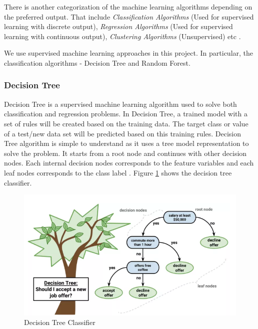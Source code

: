 \documentclass[sigconf]{acmart}
\begin{document}
There is another categorization of the machine learning algorithms depending on the preferred output. That include \emph{Classification Algorithms} (Used for supervised learning with discrete output), \emph{Regression Algorithms} (Used for supervised learning with continuous output), \emph{Clustering Algorithms} (Unsupervised) etc \cite{wiki-machine-learning}.

We use supervised machine learning approaches in this project. In particular, the classification algorithms - Decision Tree and Random Forest.

\subsubsection{Decision Tree}\label{Decision Tree}

Decision Tree is a supervised machine learning algorithm used to solve both classification and regression problems. In Decision Tree, a trained model with a set of rules will be created based on the training data. The target class or value of a test/new data set will be predicted based on this training rules. Decision Tree algorithm is simple to understand as it uses a tree model representation to solve the problem. It starts from a root node and continues with other decision nodes. Each internal decision nodes corresponds to the feature variables and each leaf nodes corresponds to the class label \cite{decision-tree}. Figure \ref{fig:Figure2} shows the decision tree classifier. 


\begin{figure}[htb]
  \centering
  \includegraphics[width=1.0\columnwidth]{images/Figure2.png}
  \caption{Decision Tree Classifier
  \cite{decision-tree}}
  \label{fig:Figure2} 
\end{figure}
\end{document}
